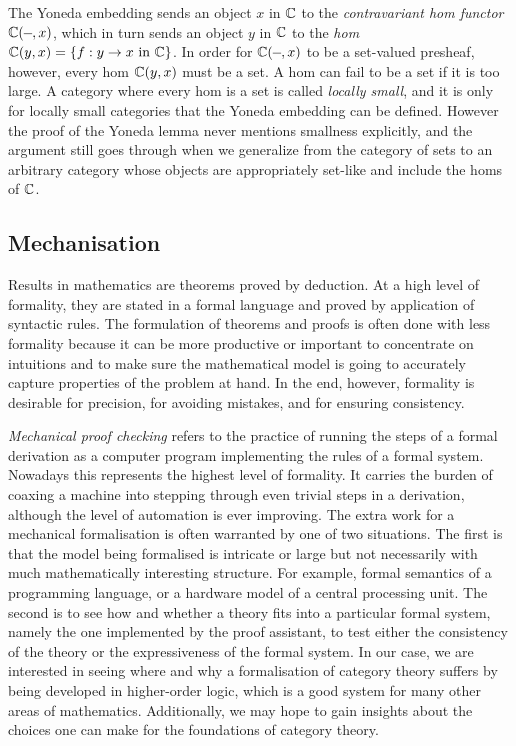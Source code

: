 \documentclass[twoside,titlepage,11pt]{article}
\begin{document}
The Yoneda embedding sends an object $x$ in $\mathbb{C}$ to the \emph{contravariant hom functor} $\C(\blank,x)$, which in turn sends an object $y$ in $\mathbb{C}$ to the \emph{hom} $\mathbb{C}(y,x)=\{f:y\to x\text{ in $\mathbb{C}$}\}$.
In order for $\C(\blank,x)$ to be a set-valued presheaf, however, every hom $\mathbb{C}(y,x)$ must be a set.
A hom can fail to be a set if it is too large.
A category where every hom is a set is called \emph{locally small}, and it is only for locally small categories that the Yoneda embedding can be defined.
However the proof of the Yoneda lemma never mentions smallness explicitly, and the argument still goes through when we generalize from the category of sets to an arbitrary category whose objects are appropriately set-like and include the homs of $\mathbb{C}$.
\subsection{Mechanisation}%
Results in mathematics are theorems proved by deduction.
At a high level of formality, they are stated in a formal language and proved by application of syntactic rules.
The formulation of theorems and proofs is often done with less formality because it can be more productive or important to concentrate on intuitions and to make sure the mathematical model is going to accurately capture properties of the problem at hand.
In the end, however, formality is desirable for precision, for avoiding mistakes, and for ensuring consistency.%

\emph{Mechanical proof checking} refers to the practice of running the steps of a formal derivation as a computer program implementing the rules of a formal system.
Nowadays this represents the highest level of formality.
It carries the burden of coaxing a machine into stepping through even trivial steps in a derivation, although the level of automation is ever improving.
The extra work for a mechanical formalisation is often warranted by one of two situations.
The first is that the model being formalised is intricate or large but not necessarily with much mathematically interesting structure.
For example, formal semantics of a programming language, or a hardware model of a central processing unit.
The second is to see how and whether a theory fits into a particular formal system, namely the one implemented by the proof assistant, to test either the consistency of the theory or the expressiveness of the formal system.
In our case, we are interested in seeing where and why a formalisation of category theory suffers by being developed in higher-order logic, which is a good system for many other areas of mathematics.
Additionally, we may hope to gain insights about the choices one can make for the foundations of category theory.%
\end{document}
